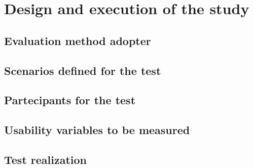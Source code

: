 %
%
\chapter{Design and execution of the study}
%
%
%
\section{Evaluation method adopter}
%
%
\section{Scenarios defined for the test}
%
%
\section{Partecipants for the test}
%
%
\section{Usability variables to be measured}
%
%
\section{Test realization}
%
%
